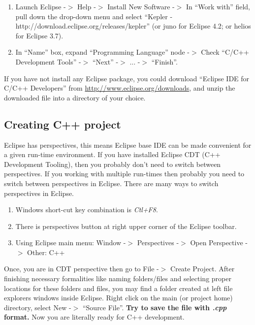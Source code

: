 \documentclass{book}
\begin{document}
\begin{enumerate}
	\item Launch Eclipse -$>$ Help -$>$ Install New Software -$>$ In \enquote{Work with} field, pull down the drop-down menu and select \enquote{Kepler - http://download.eclipse.org/releases/kepler} (or juno for Eclipse 4.2; or helios for Eclipse 3.7).

\item In \enquote{Name} box, expand \enquote{Programming Language} node -$>$ Check \enquote{C/C++ Development Tools} -$>$ \enquote{Next} -$>$ ... -$>$ \enquote{Finish}.
\end{enumerate}

If you have not install any Eclipse package, you could download \enquote{Eclipse IDE for C/C++ Developers} from \url{http://www.eclipse.org/downloads}, and unzip the downloaded file into a directory of your choice.

\subsection{Creating C++ project}

Eclipse has perspectives, this means Eclipse base IDE can be made convenient for a given run-time environment. If you have installed Eclipse CDT (C++ Development Tooling), then you probably don't need to switch between perspectives. If you working with multiple run-times then probably you need to switch between perspectives in Eclipse. There are many ways to switch perspectives in Eclipse. 

\begin{enumerate}
	\item Windows short-cut key combination is \emph{Ctl+F8}. 
	\item There is perspectives button at right upper corner of the Eclipse toolbar. 
	\item Using Eclipse main menu: Window -$>$ Perspectives -$>$ Open Perspective -$>$ Other: C++

\end{enumerate}

Once, you are in CDT perspective then go to File -$>$ Create Project. After finishing necessary formalities like naming folders/files and selecting proper locations for these folders and files, you may find a folder created at left file explorers windows inside Eclipse. Right click on the main (or project home) directory, select New -$>$ \enquote{Source File}. \textbf{Try to save the file with \emph{.cpp} format.} Now you are literally ready for C++ development. 
\end{document}
